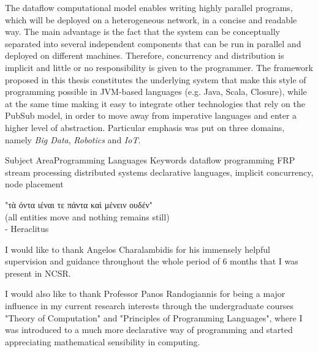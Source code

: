 \documentclass{dithesis}
\begin{document}


\maketitle

\begin{thesisabstract}[Abstract]

The dataflow computational model enables writing highly parallel programs, which will be deployed on a heterogeneous network, in a concise and readable way. The main advantage is the fact that the system can be conceptually separated into several independent components that can be run in parallel and deployed on different machines. Therefore, concurrency and distribution is implicit and little or no responsibility is given to the programmer. The framework proposed in this thesis constitutes the underlying system that make this style of programming possible in JVM-based languages (e.g. Java, Scala, Closure), while at the same time making it easy to integrate other technologies that rely on the PubSub model, in order to move away from imperative languages and enter a higher level of abstraction. Particular emphasis was put on three domains, namely \textit{Big Data}, \textit{Robotics} and \textit{IoT}.


\thesiskeywords
{Subject Area}{Programming Languages}
{Keywords}
	{dataflow programming}
	{FRP}
	{stream processing}
	{distributed systems}
	{declarative languages, implicit concurrency, node placement}
\end{thesisabstract}

\begin{thesisdedication}
"τὰ όντα ιέναι τε πάντα καὶ μένειν ουδέν" \\
(all entities move and nothing remains still) \\
- Heraclitus
\end{thesisdedication}

\begin{thesisacknowledgments}[Acknowledgements]

I would like to thank Angelos Charalambidis for his immensely helpful supervision and guidance throughout the whole period of 6 months that I was present in NCSR. 

I would also like to thank Professor Panos Randogiannis for being a major influence in my current research interests through the undergraduate courses "Theory of Computation" and "Principles of Programming Languages", where I was introduced to a much more declarative way of programming and started appreciating mathematical sensibility in computing.

\end{thesisacknowledgments}
\end{document}
